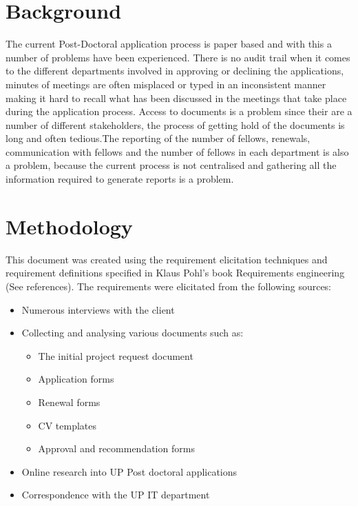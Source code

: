 \documentclass[12pt]{article}
\begin{document}
	\section{Background} %
	\vspace{0.2in}
	The current Post-Doctoral application process is paper based and with this a number of problems have been experienced. There is no audit trail when it comes to the different departments involved in approving or declining the applications, minutes of meetings are often misplaced or typed in an inconsistent manner making it hard to recall what has been discussed in the meetings that take place during the application process. Access to documents is a problem since their are a number of different stakeholders, the process of getting hold of the documents is long and often tedious.The reporting of the number of fellows, renewals, communication with fellows and the number of fellows in each department is also a problem, because the current process is not centralised and gathering all the information required to generate reports is a problem.
	\vspace{0.5in}
	
	\newpage
	\section{Methodology} %
	\vspace{0.2in}
	
	This document was created using the requirement elicitation techniques and requirement definitions specified in Klaus Pohl’s book Requirements engineering (See references).
	The requirements were elicitated from the following sources:
	\begin{itemize}
		\item Numerous interviews with the client
		\item Collecting and analysing various documents such as:
		\begin{itemize}
			\item The initial project request document
			\item Application forms
			\item Renewal forms
			\item CV templates
			\item Approval and recommendation forms			 
		\end{itemize}		
		\item Online research into UP Post doctoral applications
		\item Correspondence with the UP IT department
	\end{itemize}	
	
\end{document}

